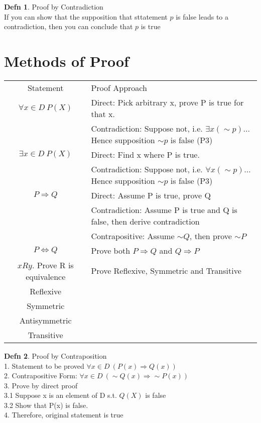 \documentclass[a4paper]{article}
\theoremstyle{definition}
\newtheorem*{defn}{Defn}
\begin{document}
\begin{defn}{Proof by Contradiction}\\ If you can show that the supposition that sttatement $p$ is false leads to a contradiction, then you can conclude that $p$ is true \end{defn}

\section{Methods of Proof}

\begin{tabular} {|c|l|}
  \hline
  Statement & Proof Approach \\
  $\forall x \in D\ P(X)$ & Direct: Pick arbitrary x, prove P is true for that x. \\
                    & Contradiction: Suppose not, i.e. $ \exists x(\sim p)$... Hence supposition $\sim p$ is false (P3) \\
  \hline
  $\exists x \in D\ P(X)$ & Direct: Find x where P is true. \\
                    & Contradiction: Suppose not, i.e. $\forall x (\sim p)$... Hence supposition $\sim p$ is false (P3) \\
  \hline
  $P \Rightarrow Q$ & Direct: Assume P is true, prove Q \\
                    & Contradiction: Assume P is true and Q is false, then derive contradiction \\
                    & Contrapositive: Assume $\sim Q$, then prove $\sim P$ \\
  \hline
  $P \Leftrightarrow Q$ & Prove both $P \Rightarrow Q$ and $Q \Rightarrow P$ \\
  \hline
  $xRy$. Prove R is equivalence  & Prove Reflexive, Symmetric and Transitive \\
  \hline
  Reflexive &  \\
  \hline
  Symmetric &  \\
  \hline
  Antisymmetric &  \\
  \hline
  Transitive &  \\
  \hline


\end{tabular}

\begin{defn}{Proof by Contraposition}\\
  1. Statement to be proved $\forall x \in D\ (P(x) \Rightarrow Q(x))$\\
  2. Contrapositive Form: $\forall x \in D\ (\sim Q(x) \Rightarrow \sim P(x))$\\
  3. Prove by direct proof\\
  3.1 Suppose x is an element of D s.t. $Q(X)$ is false\\
  3.2 Show that P(x) is false.\\
  4. Therefore, original statement is true
\end{defn}
\end{document}
